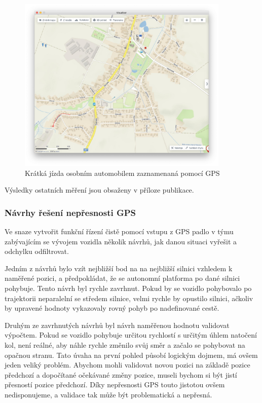 \documentclass[czech, bachelor]{diploma}
\begin{document}
\begin{figure}
    \centering
    \includegraphics[width=0.9\textwidth]{Figures/olsinaautem.png}
    \caption{Krátká jízda osobním automobilem zaznamenaná pomocí GPS}
    \label{fig:olsinaautem}
\end{figure}

Výsledky ostatních měření jsou obsaženy v příloze publikace.

\subsubsection{Návrhy řešení nepřesnosti GPS}

Ve snaze vytvořit funkční řízení čistě pomocí vstupu z GPS padlo v týmu zabývajícím se vývojem vozidla několik návrhů, jak danou
situaci vyřešit a odchylku odfiltrovat.

Jedním z návrhů bylo vzít nejbližší bod na na nejbližší silnici vzhledem k naměřené pozici, a předpokládat, že se autonomní 
platforma po dané silnici pohybuje. Tento návrh byl rychle zavrhnut. Pokud by se vozidlo pohybovalo po trajektorii neparalelní
se středem silnice, velmi rychle by opustilo silnici, ačkoliv by upravené hodnoty vykazovaly rovný pohyb po nadefinované cestě.

Druhým ze zavrhnutých návrhů byl návrh naměřenou hodnotu validovat výpočtem. Pokud se vozidlo pohybuje určitou rychlostí s určitým
úhlem natočení kol, není reálné, aby náhle rychle změnilo svůj směr a začalo se pohybovat na opačnou stranu. Tato úvaha na první
pohled působí logickým dojmem, má ovšem jeden veliký problém. Abychom mohli validovat novou pozici na základě pozice předchozí 
a dopočítané očekávané změny pozice, museli bychom si být jistí přesností pozice předchozí. Díky nepřesnosti GPS touto jistotou
ovšem nedisponujeme, a validace tak může být problematická a nepřesná.
\end{document}
